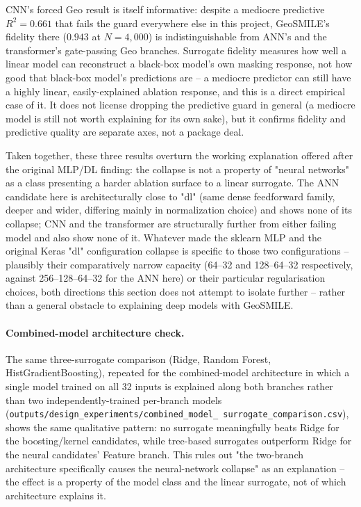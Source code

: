 CNN's forced Geo result is itself informative: despite a mediocre predictive
$R^2=0.661$ that fails the guard everywhere else in this project, GeoSMILE's
fidelity there ($0.943$ at $N{=}4{,}000$) is indistinguishable from ANN's and
the transformer's gate-passing Geo branches. Surrogate fidelity measures how
well a linear model can reconstruct a black-box model's own masking
response, not how good that black-box model's predictions are -- a mediocre
predictor can still have a highly linear, easily-explained ablation
response, and this is a direct empirical case of it. It does not license
dropping the predictive guard in general (a mediocre model is still not
worth explaining for its own sake), but it confirms fidelity and predictive
quality are separate axes, not a package deal.

Taken together, these three results overturn the working explanation offered
after the original MLP/DL finding: the collapse is not a property of "neural
networks" as a class presenting a harder ablation surface to a linear
surrogate. The ANN candidate here is architecturally close to "dl" (same
dense feedforward family, deeper and wider, differing mainly in
normalization choice) and shows none of its collapse; CNN and the
transformer are structurally further from either failing model and also
show none of it. Whatever made the sklearn MLP and the original Keras "dl"
configuration collapse is specific to those two configurations -- plausibly
their comparatively narrow capacity (64--32 and 128--64--32 respectively,
against 256--128--64--32 for the ANN here) or their particular
regularisation choices, both directions this section does not attempt to
isolate further -- rather than a general obstacle to explaining deep models
with GeoSMILE.

\paragraph{Combined-model architecture check.} The same three-surrogate
comparison (Ridge, Random Forest, HistGradientBoosting), repeated for the
combined-model architecture in which a single model trained on all 32 inputs
is explained along both branches rather than two independently-trained
per-branch models (\texttt{outputs/design\_experiments/combined\_model\_
surrogate\_comparison.csv}), shows the same qualitative pattern: no
surrogate meaningfully beats Ridge for the boosting/kernel candidates, while
tree-based surrogates outperform Ridge for the neural candidates' Feature
branch. This rules out "the two-branch architecture specifically causes the
neural-network collapse" as an explanation -- the effect is a property of
the model class and the linear surrogate, not of which architecture explains
it.

